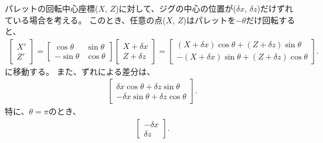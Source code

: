 




パレットの回転中心座標($X$, $Z$)に対して、ジグの中心の位置が($\delta x$, $\delta z$)だけずれている場合を考える。
このとき、任意の点($X$, $Z$)はパレットを$-\theta$だけ回転すると、
\begin{align*}
  \left[
    \begin{array}{c}
      X'\\
      Z'
    \end{array}
  \right]
  = \left[
    \begin{array}{cc}
      \cos\theta & \sin\theta\\
      -\sin\theta & \cos\theta
    \end{array}
  \right]\!\!
  \left[
    \begin{array}{c}
      X+\delta x\\
      Z+\delta z
    \end{array}
  \right]
  = \left[
    \begin{array}{c}
      (X+\delta x)\cos\theta+(Z+\delta z)\sin\theta\\
      -(X+\delta x)\sin\theta+(Z+\delta z)\cos\theta
    \end{array}
  \right].
\end{align*}
に移動する。
また、ずれによる差分は、
\begin{align*}
  \left[
    \begin{array}{c}
      \delta x\cos\theta+\delta z\sin\theta\\
      -\delta x\sin\theta+\delta z\cos\theta
    \end{array}
  \right].
\end{align*}
特に、$\theta = \pi$のとき、
\begin{align*}
  \left[
    \begin{array}{c}
      -\delta x\\
      \delta z
    \end{array}
  \right].
\end{align*}


